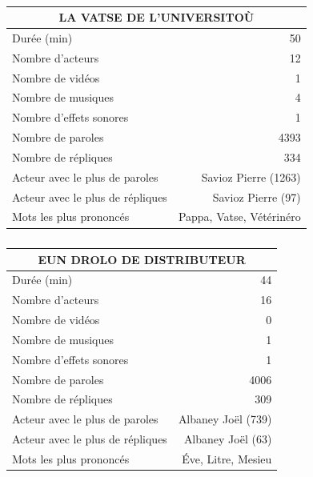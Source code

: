     \begin{table}[]
    \centering
    \caption{}
    \begin{tabular}{lr}\toprule\multicolumn{2}{c}{LA VATSE DE L’UNIVERSITOÙ} \\\midrule
\multicolumn{1}{l}{Durée (min)}&50\\
\multicolumn{1}{l}{Nombre d'acteurs}&12\\
\multicolumn{1}{l}{Nombre de vidéos}&1\\
\multicolumn{1}{l}{Nombre de musiques}&4\\
\multicolumn{1}{l}{Nombre d'effets sonores}&1\\
\multicolumn{1}{l}{Nombre de paroles}&4393\\
\multicolumn{1}{l}{Nombre de répliques}&334\\
\multicolumn{1}{l}{Acteur avec le plus de paroles}&Savioz Pierre (1263)\\
\multicolumn{1}{l}{Acteur avec le plus de répliques}&Savioz Pierre (97)\\
\multicolumn{1}{l}{Mots les plus prononcés}&Pappa, Vatse, Vétérinéro\\
    \bottomrule
    \end{tabular}%
    \end{table}
    \begin{table}[]
    \centering
    \caption{}
    \begin{tabular}{lr}\toprule\multicolumn{2}{c}{EUN DROLO DE DISTRIBUTEUR} \\\midrule
\multicolumn{1}{l}{Durée (min)}&44\\
\multicolumn{1}{l}{Nombre d'acteurs}&16\\
\multicolumn{1}{l}{Nombre de vidéos}&0\\
\multicolumn{1}{l}{Nombre de musiques}&1\\
\multicolumn{1}{l}{Nombre d'effets sonores}&1\\
\multicolumn{1}{l}{Nombre de paroles}&4006\\
\multicolumn{1}{l}{Nombre de répliques}&309\\
\multicolumn{1}{l}{Acteur avec le plus de paroles}&Albaney Joël (739)\\
\multicolumn{1}{l}{Acteur avec le plus de répliques}&Albaney Joël (63)\\
\multicolumn{1}{l}{Mots les plus prononcés}&Éve, Litre, Mesieu\\
    \bottomrule
    \end{tabular}%
    \end{table}
